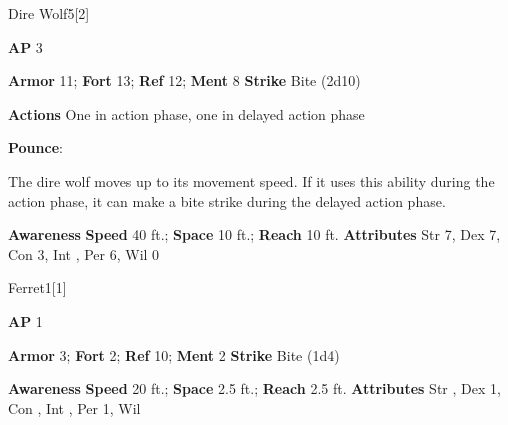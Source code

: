 \begin{monsection}{Dire Wolf}{5}[2]
\vspace{-1em}\vspace{-1em}
\begin{spellcontent}
\begin{spelltargetinginfo}
{\textbf{AP} 3}

\pari \textbf{Armor} 11;
\textbf{Fort} 13;
\textbf{Ref} 12;
\textbf{Ment} 8
\pari \textbf{Strike} Bite  (2d10)


\pari \textbf{Actions} One in action phase, one in delayed action phase
\end{spelltargetinginfo}


\begin{spelleffects}

\pari
\textbf{Pounce}:

The dire wolf moves up to its movement speed.
If it uses this ability during the action phase, it can make a bite strike during the delayed action phase.




\end{spelleffects}

\end{spellcontent}

\begin{monsterfooter}
\pari \textbf{Awareness} 
\pari \textbf{Speed} 40 ft.;
\textbf{Space} 10 ft.;
\textbf{Reach} 10 ft.
\pari \textbf{Attributes}
Str 7,
Dex 7,
Con 3,
Int ,
Per 6,
Wil 0
\end{monsterfooter}
\end{monsection}



\begin{monsection}{Ferret}{1}[1]
\vspace{-1em}\vspace{-1em}
\begin{spellcontent}
\begin{spelltargetinginfo}
{\textbf{AP} 1}

\pari \textbf{Armor} 3;
\textbf{Fort} 2;
\textbf{Ref} 10;
\textbf{Ment} 2
\pari \textbf{Strike} Bite  (1d4)



\end{spelltargetinginfo}


\end{spellcontent}

\begin{monsterfooter}
\pari \textbf{Awareness} 
\pari \textbf{Speed} 20 ft.;
\textbf{Space} 2.5 ft.;
\textbf{Reach} 2.5 ft.
\pari \textbf{Attributes}
Str ,
Dex 1,
Con ,
Int ,
Per 1,
Wil 
\end{monsterfooter}
\end{monsection}



